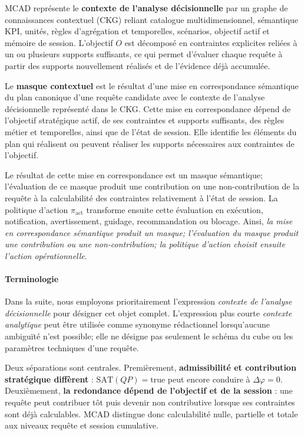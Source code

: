 \documentclass[journal]{IEEEtran}
\begin{document}
MCAD représente le \textbf{contexte de l'analyse décisionnelle} par un graphe de connaissances contextuel (CKG) reliant catalogue multidimensionnel, sémantique KPI, unités, règles d'agrégation et temporelles, scénarios, objectif actif et mémoire de session. L'objectif $O$ est décomposé en contraintes explicites reliées à un ou plusieurs supports suffisants, ce qui permet d'évaluer chaque requête à partir des supports nouvellement réalisés et de l'évidence déjà accumulée.

Le \textbf{masque contextuel} est le résultat d'une mise en correspondance sémantique du plan canonique d'une requête candidate avec le contexte de l'analyse décisionnelle représenté dans le CKG. Cette mise en correspondance dépend de l'objectif stratégique actif, de ses contraintes et supports suffisants, des règles métier et temporelles, ainsi que de l'état de session. Elle identifie les éléments du plan qui réalisent ou peuvent réaliser les supports nécessaires aux contraintes de l'objectif.

Le résultat de cette mise en correspondance est un masque sémantique; l'évaluation de ce masque produit une contribution ou une non-contribution de la requête à la calculabilité des contraintes relativement à l'état de session. La politique d'action $\pi_{\mathrm{act}}$ transforme ensuite cette évaluation en exécution, notification, avertissement, guidage, recommandation ou blocage. Ainsi, \emph{la mise en correspondance sémantique produit un masque; l'évaluation du masque produit une contribution ou une non-contribution; la politique d'action choisit ensuite l'action opérationnelle}.

\paragraph*{Terminologie} Dans la suite, nous employons prioritairement l'expression \emph{contexte de l'analyse décisionnelle} pour désigner cet objet complet. L'expression plus courte \emph{contexte analytique} peut être utilisée comme synonyme rédactionnel lorsqu'aucune ambiguïté n'est possible; elle ne désigne pas seulement le schéma du cube ou les paramètres techniques d'une requête.

Deux séparations sont centrales. Premièrement, \textbf{admissibilité et contribution stratégique diffèrent} : $\mathrm{SAT}(QP)=\mathrm{true}$ peut encore conduire à $\Delta\varphi=0$. Deuxièmement, \textbf{la redondance dépend de l'objectif et de la session} : une requête peut contribuer tôt puis devenir non contributive lorsque ses contraintes sont déjà calculables. MCAD distingue donc calculabilité nulle, partielle et totale aux niveaux requête et session cumulative.
\end{document}
